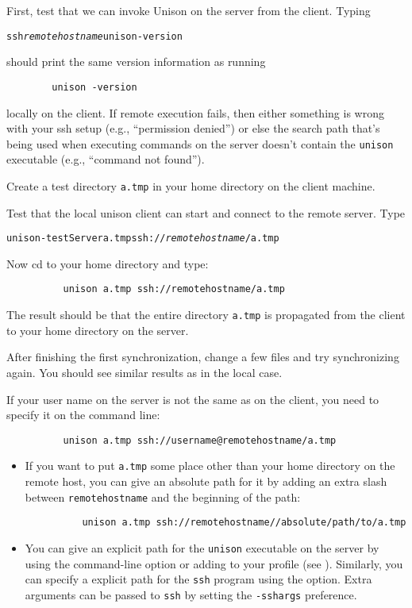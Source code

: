\documentclass{article}
\newcommand{\NT}[1]{\textit{#1}}
\begin{document}
First, test that we can invoke Unison on the server from the client.
Typing
\begin{alltt}
        ssh \NT{remotehostname} unison -version
\end{alltt}
should print the same version information as running
\begin{verbatim}
        unison -version
\end{verbatim}
locally on the client.  If remote execution fails, then either
something is wrong with your ssh setup (e.g., ``permission denied'')
or else the search path that's being used when executing commands on
the server doesn't contain the \verb|unison| executable (e.g.,
``command not found'').

Create a test directory {\tt a.tmp} in your home directory on the client
machine.  

Test that the local unison client can start and connect to the
remote server.  Type
\begin{alltt}
          unison -testServer a.tmp ssh://\NT{remotehostname}/a.tmp
\end{alltt}

Now cd to your home directory and type:
\begin{verbatim}
          unison a.tmp ssh://remotehostname/a.tmp
\end{verbatim}
The result should be that the entire directory {\tt a.tmp} is propagated
from the client to your home directory on the server.

After finishing the first synchronization, change a few files and try
synchronizing again.  You should see similar results as in the local
case.

If your user name on the server is not the same as on the client, you
need to specify it on the command line:
\begin{verbatim}
          unison a.tmp ssh://username@remotehostname/a.tmp
\end{verbatim}

\begin{itemize}
\item If you want to put \verb|a.tmp| some place other than your home
directory on the remote host, you can give an absolute path for it by
adding an extra slash between \verb|remotehostname| and the beginning
of the path:
\begin{verbatim}
          unison a.tmp ssh://remotehostname//absolute/path/to/a.tmp
\end{verbatim}

\item You can give an explicit path for the \verb|unison| executable
  on the server by using the command-line option  or adding
   to your profile (see
  ).  Similarly, you can specify a
  explicit path for the \verb|ssh| program using the 
  option.
  Extra arguments can be passed to \verb|ssh| by setting the
  \verb|-sshargs| preference.
\end{itemize}
\end{document}
